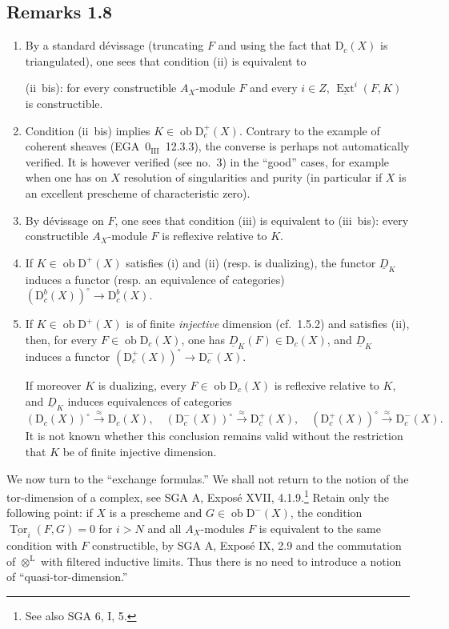\documentclass[11pt]{article}
\DeclareMathOperator{\Ext}{Ext}
\DeclareMathOperator{\Tor}{Tor}
\newcommand{\D}{\mathrm{D}}
\newcommand{\ob}{\operatorname{ob}}
\providecommand{\ob}{\operatorname{ob}}
\begin{document}
\subsection*{Remarks 1.8}
\begin{enumerate}[label=\alph*)]
\item By a standard dévissage (truncating $F$ and using the fact that $\D_c(X)$ is triangulated), one sees that condition (ii) is equivalent to

(ii~bis): for every constructible $A_X$-module $F$ and every $i \in Z$, $\underline{\Ext}^i(F,K)$ is constructible.

\item Condition (ii~bis) implies $K \in \ob \D_c^{+}(X)$. Contrary to the example of coherent sheaves (EGA~$0_{\mathrm{III}}$~12.3.3), the converse is perhaps not automatically verified. It is however verified (see no.~3) in the ``good'' cases, for example when one has on $X$ resolution of singularities and purity (in particular if $X$ is an excellent prescheme of characteristic zero).

\item By dévissage on $F$, one sees that condition (iii) is equivalent to (iii~bis): every constructible $A_X$-module $F$ is reflexive relative to $K$.

\item If $K \in \ob \D^{+}(X)$ satisfies (i) and (ii) (resp. is dualizing), the functor $\underline{D}_K$ induces a functor (resp. an equivalence of categories) $(\D_c^{b}(X))^{\circ} \to \D_c^{b}(X)$.

\item If $K \in \ob \D^{+}(X)$ is of finite \emph{injective} dimension (cf.~1.5.2) and satisfies (ii), then, for every $F \in \ob \D_c(X)$, one has $\underline{D}_K(F) \in \D_c(X)$, and $\underline{D}_K$ induces a functor $(\D_c^{+}(X))^{\circ} \to \D_c^{-}(X)$.

If moreover $K$ is dualizing, every $F \in \ob \D_c(X)$ is reflexive relative to $K$, and $\underline{D}_K$ induces equivalences of categories
\[
(\D_c(X))^{\circ} \xrightarrow{\approx} \D_c(X), \quad (\D_c^{-}(X))^{\circ} \xrightarrow{\approx} \D_c^{+}(X), \quad (\D_c^{+}(X))^{\circ} \xrightarrow{\approx} \D_c^{-}(X).
\]
It is not known whether this conclusion remains valid without the restriction that $K$ be of finite injective dimension.
\end{enumerate}

We now turn to the ``exchange formulas.'' We shall not return to the notion of the tor-dimension of a complex, see SGA A, Exposé XVII, 4.1.9.\footnote{See also SGA 6, I, 5.} Retain only the following point: if $X$ is a prescheme and $G\in\ob\D^-(X)$, the condition $\underline{\Tor}_i(F,G)=0$ for $i>N$ and all $A_X$-modules $F$ is equivalent to the same condition with $F$ constructible, by SGA A, Exposé IX, 2.9 and the commutation of $\otimes^{\mathrm L}$ with filtered inductive limits. Thus there is no need to introduce a notion of ``quasi-tor-dimension.''
\end{document}
